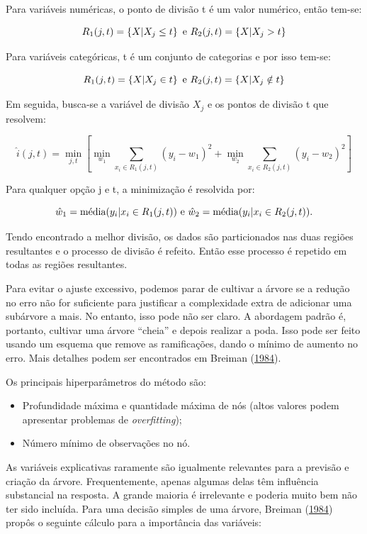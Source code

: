 \documentclass[
	12pt,				%
	a4paper,		%
	oneside,    %
	chapter=TITLE,		   %
	section=TITLE,		   %
	subsection=TITLE,	   %
	subsubsection=TITLE, %
	english,			%
	french,				%
	spanish,			%
	brazil,				%
]{abntex2}
\begin{document}
Para variáveis numéricas, o ponto de divisão t é um valor numérico,
então tem-se:

\[R_1(j,t) = \left\{ X|X_j \leq t \right\} \hbox{ e }  R_2(j,t) = \left\{X|X_j > t \right\}\]

Para variáveis categóricas, t é um conjunto de categorias e por isso
tem-se:

\[R_1(j,t) = \left\{ X|X_j \in t \right\} \hbox{ e }  R_2(j,t) = \left\{X|X_j \notin t \right\}\]

Em seguida, busca-se a variável de divisão \(X_j\) e os pontos de
divisão t que resolvem:

\[\hat{i}(j,t) = \underset{j,t}{\min} \left[ \underset{w_1}{\min} \sum_{x_i \in R_1 (j,t)} (y_i - w_1)^2 + \underset{w_2}{\min}  \sum_{x_i \in R_2 (j,t)} (y_i - w_2)^2   \right]\]

Para qualquer opção j e t, a minimização é resolvida por:

\[\hat{w}_1 = \hbox{média}(y_i|x_i \in R_1(j,t)) \hbox{ e } \hat{w}_2 = \hbox{média} (y_i|x_i \in R_2(j,t)).\]

Tendo encontrado a melhor divisão, os dados são particionados nas duas
regiões resultantes e o processo de divisão é refeito. Então esse
processo é repetido em todas as regiões resultantes.

Para evitar o ajuste excessivo, podemos parar de cultivar a árvore se a
redução no erro não for suficiente para justificar a complexidade extra
de adicionar uma subárvore a mais. No entanto, isso pode não ser claro.
A abordagem padrão é, portanto, cultivar uma árvore ``cheia'' e depois
realizar a poda. Isso pode ser feito usando um esquema que remove as
ramificações, dando o mínimo de aumento no erro. Mais detalhes podem ser
encontrados em Breiman (\protect\hyperlink{ref-breiman1984j}{1984}).

Os principais hiperparâmetros do método são:

\begin{itemize}
\item
  Profundidade máxima e quantidade máxima de nós (altos valores podem
  apresentar problemas de \emph{overfitting});
\item
  Número mínimo de observações no nó.
\end{itemize}

As variáveis explicativas raramente são igualmente relevantes para a
previsão e criação da árvore. Frequentemente, apenas algumas delas têm
influência substancial na resposta. A grande maioria é irrelevante e
poderia muito bem não ter sido incluída. Para uma decisão simples de uma
árvore, Breiman (\protect\hyperlink{ref-breiman1984j}{1984}) propôs o
seguinte cálculo para a importância das variáveis:
\end{document}
